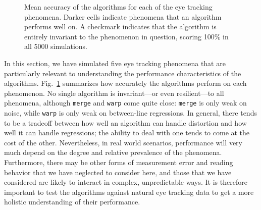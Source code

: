 \documentclass[doc,biblatex]{apa7}
\begin{document}
	\begin{figure}
	\vspace*{2pt}
	\caption{Mean accuracy of the algorithms for each of the eye tracking phenomena. Darker cells indicate phenomena that an algorithm performs well on. A checkmark indicates that the algorithm is entirely invariant to the phenomenon in question, scoring 100\% in all 5000 simulations.}
	\label{fig06}
	\end{figure}

In this section, we have simulated five eye tracking phenomena that are particularly relevant to understanding the performance characteristics of the algorithms. Fig.~\ref{fig06} summarizes how accurately the algorithms perform on each phenomenon. No single algorithm is invariant---or even resilient---to all phenomena, although \texttt{merge} and \texttt{warp} come quite close: \texttt{merge} is only weak on noise, while \texttt{warp} is only weak on between-line regressions. In general, there tends to be a tradeoff between how well an algorithm can handle distortion and how well it can handle regressions; the ability to deal with one tends to come at the cost of the other. Nevertheless, in real world scenarios, performance will very much depend on the degree and relative prevalence of the phenomena. Furthermore, there may be other forms of measurement error and reading behavior that we have neglected to consider here, and those that we have considered are likely to interact in complex, unpredictable ways. It is therefore important to test the algorithms against natural eye tracking data to get a more holistic understanding of their performance.

\end{document}
